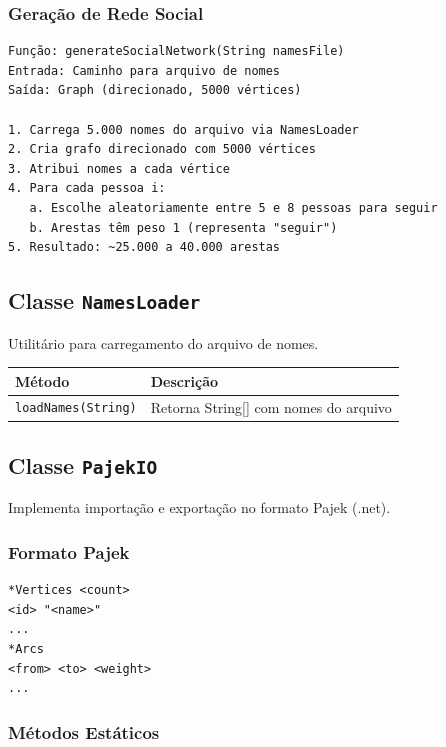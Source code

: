 \documentclass[12pt,a4paper]{article}
\begin{document}
\subsubsection{Geração de Rede Social}

\begin{verbatim}
Função: generateSocialNetwork(String namesFile)
Entrada: Caminho para arquivo de nomes
Saída: Graph (direcionado, 5000 vértices)

1. Carrega 5.000 nomes do arquivo via NamesLoader
2. Cria grafo direcionado com 5000 vértices
3. Atribui nomes a cada vértice
4. Para cada pessoa i:
   a. Escolhe aleatoriamente entre 5 e 8 pessoas para seguir
   b. Arestas têm peso 1 (representa "seguir")
5. Resultado: ~25.000 a 40.000 arestas
\end{verbatim}

\subsection{Classe \texttt{NamesLoader}}

Utilitário para carregamento do arquivo de nomes.

\begin{table}[h]
\centering
\begin{tabular}{|l|l|}
\hline
\textbf{Método} & \textbf{Descrição} \\
\hline
\texttt{loadNames(String)} & Retorna String[] com nomes do arquivo \\
\hline
\end{tabular}
\end{table}

\subsection{Classe \texttt{PajekIO}}

Implementa importação e exportação no formato Pajek (.net).

\subsubsection{Formato Pajek}

\begin{verbatim}
*Vertices <count>
<id> "<name>"
...
*Arcs
<from> <to> <weight>
...
\end{verbatim}

\subsubsection{Métodos Estáticos}
\end{document}
